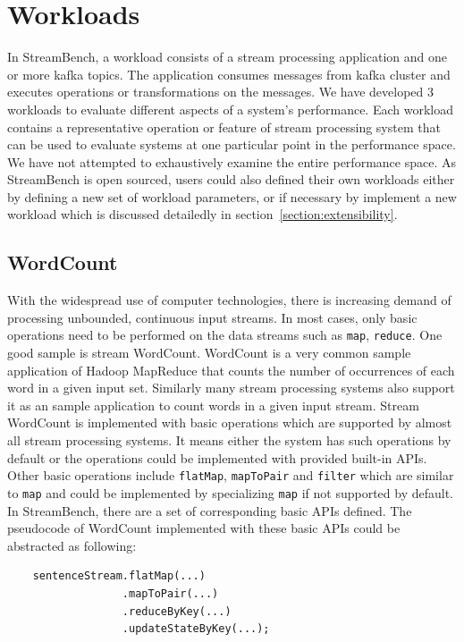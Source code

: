 \section{Workloads}
\label{section:workloads}

In StreamBench, a workload consists of a stream processing application and one or more kafka topics. The application consumes messages from kafka cluster and executes operations or transformations on the messages. We have developed 3 workloads to evaluate different aspects of a system's performance. Each workload contains a representative operation or feature of stream processing system that can be used to evaluate systems at one particular point in the performance space. We have not attempted to exhaustively examine the entire performance space. As StreamBench is open sourced, users could also defined their own workloads either by defining a new set of workload parameters, or if necessary by implement a new workload which is discussed detailedly in section~\ref{section:extensibility}.


\subsection{WordCount}

With the widespread use of computer technologies, there is increasing demand of processing unbounded, continuous input streams. In most cases, only basic operations need to be performed on the data streams such as \texttt{map}, \texttt{reduce}. One good sample is stream WordCount. WordCount is a very common sample application of Hadoop MapReduce that counts the number of occurrences of each word in a given input set. \cite{MapReduce} Similarly many stream processing systems also support it as an sample application to count words in a  given input stream. Stream WordCount is implemented with basic operations which are supported by almost all stream processing systems. It means either the system has such operations by default or the operations could be implemented with provided built-in APIs. Other basic operations include \texttt{flatMap}, \texttt{mapToPair} and \texttt{filter} which are similar to \texttt{map} and could be implemented by specializing \texttt{map} if not supported by default. In StreamBench, there are a set of corresponding basic APIs defined. The pseudocode of WordCount implemented with these basic APIs could be abstracted as following:

\begin{lstlisting}
    sentenceStream.flatMap(...)
                  .mapToPair(...)
                  .reduceByKey(...)
                  .updateStateByKey(...);

\end{lstlisting}

